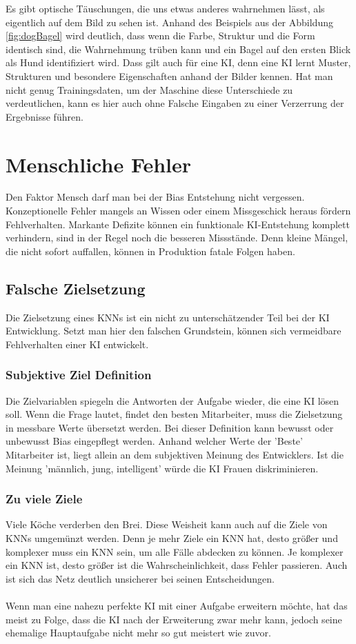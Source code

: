 \documentclass[12pt,oneside,a4paper,parskip]{scrbook}
\begin{document}
Es gibt optische Täuschungen, die uns etwas anderes wahrnehmen lässt, als eigentlich auf dem Bild zu sehen ist. Anhand des Beispiels aus der Abbildung \ref{fig:dogBagel} wird deutlich, dass wenn die Farbe, Struktur und die Form identisch sind, die Wahrnehmung trüben kann und ein Bagel auf den ersten Blick als Hund identifiziert wird. Dass gilt auch für eine KI, denn eine KI lernt Muster, Strukturen und besondere Eigenschaften anhand der Bilder kennen. Hat man nicht genug Trainingsdaten, um der Maschine diese Unterschiede zu verdeutlichen, kann es hier auch ohne Falsche Eingaben zu einer Verzerrung der Ergebnisse führen.

\section{Menschliche Fehler}
Den Faktor Mensch darf man bei der Bias Entstehung nicht vergessen. Konzeptionelle Fehler mangels an Wissen oder einem Missgeschick heraus fördern Fehlverhalten. Markante Defizite können ein funktionale KI-Entstehung komplett verhindern, sind in der Regel noch die besseren Missstände. Denn kleine Mängel, die nicht sofort auffallen, können in Produktion fatale Folgen haben.
\subsection{Falsche Zielsetzung}
Die Zielsetzung eines KNNs ist ein nicht zu unterschätzender Teil bei der KI Entwicklung. Setzt man hier den falschen Grundstein, können sich vermeidbare Fehlverhalten einer KI entwickelt.
\subsubsection{Subjektive Ziel Definition}
Die Zielvariablen spiegeln die Antworten der Aufgabe wieder, die eine KI lösen soll. Wenn die Frage lautet, findet den besten Mitarbeiter, muss die Zielsetzung in messbare Werte übersetzt werden. Bei dieser Definition kann bewusst oder unbewusst Bias eingepflegt werden. Anhand welcher Werte der 'Beste' Mitarbeiter ist, liegt allein an dem subjektiven Meinung des Entwicklers. Ist die Meinung 'männlich, jung, intelligent' würde die KI Frauen diskriminieren.
\subsubsection{Zu viele Ziele}
Viele Köche verderben den Brei. Diese Weisheit kann auch auf die Ziele von KNNs umgemünzt werden. Denn je mehr Ziele ein KNN hat, desto größer und komplexer muss ein KNN sein, um alle Fälle abdecken zu können. Je komplexer ein KNN ist, desto größer ist die Wahrscheinlichkeit, dass Fehler passieren. Auch ist sich das Netz deutlich unsicherer bei seinen Entscheidungen.
\\\\ %
Wenn man eine nahezu perfekte KI mit einer Aufgabe erweitern möchte, hat das meist zu Folge, dass die KI nach der Erweiterung zwar mehr kann, jedoch seine ehemalige Hauptaufgabe nicht mehr so gut meistert wie zuvor.
\end{document}
